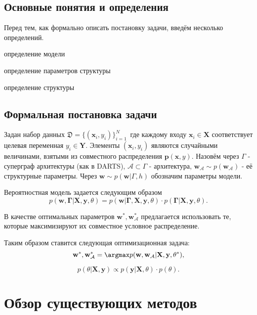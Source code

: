 \documentclass[12pt]{article}
\begin{document}
	\subsection{Основные понятия и определения}
	Перед тем, как формально описать постановку задачи, введём несколько определений.
	
	определение модели
	
	определение параметров структуры
	
	определение структуры
	
	
	\subsection{Формальная постановка задачи}
	
	Задан набор данных $\mathfrak{D} = \{(\mathbf{x}_i, y_i)\}_{i=1}^{N}$\, где каждому входу $\mathbf{x}_i\in \mathbf{X}$ соответствует целевая переменная $y_i\in \mathbf{Y}$. Элементы $(\mathbf{x}_i, y_i)$ являются случайными величинами, взятыми из совместного распределения $\mathbf{p}(\mathbf{x}, y)$. Назовём через $\Gamma$ - суперграф архитектуры (как в DARTS), $\mathcal{A}\subset \Gamma$ - архитектура,  $\mathbf{w_{\mathcal{A}}} \sim p(\mathbf{w_{\mathcal{A}}})$ - её структурные параметры. Через $\mathbf{w} \sim p(\mathbf{w}|\Gamma, h)$ обозначим параметры модели. 
	
	Вероятностная модель задается следующим образом
	$$p(\mathbf{w}, \mathbf{\Gamma}|\mathbf{X}, \mathbf{y}, \theta) = p(\mathbf{w}|\mathbf{\Gamma}, \mathbf{X}, \mathbf{y}, \theta)\cdot p(\mathbf{\Gamma}|\mathbf{X}, \mathbf{y}, \theta).$$
	
	В качестве оптимальных параметров $\mathbf{w}^{*}, \mathbf{w^{*}_{\mathcal{A}}}$ предлагается использовать те, которые максимизируют их совместное условное распределение.
	
	Таким образом ставится следующая оптимизационная задача:
	$$\mathbf{w}^{*}, \mathbf{w^{*}_{\mathcal{A}}} = \argmax p(\mathbf{w}, \mathbf{w_{\mathcal{A}}}|\mathbf{X}, \mathbf{y}, \theta^{*}),$$
	
	$$p(\theta|\mathbf{X}, \mathbf{y})\propto p(\mathbf{y}|\mathbf{X}, \theta)\cdot p(\theta).$$
	
	
	\newpage
	\section{Обзор существующих методов}
	
\end{document}
